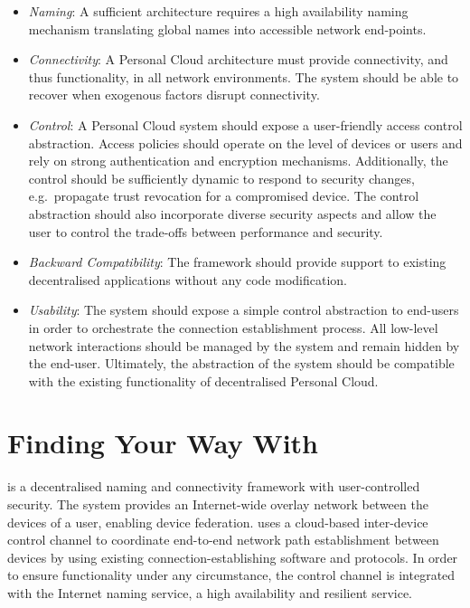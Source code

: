 \begin{itemize}
    \item {\it Naming}\/: A sufficient architecture requires a high
    availability naming mechanism translating global names into accessible
    network end-points.

  \item {\it Connectivity}\/: A Personal Cloud architecture must provide
    connectivity, and thus functionality, in all network environments.  The
    system should be able to recover when exogenous factors disrupt
    connectivity.

  \item {\it Control}\/: A Personal Cloud system should expose a user-friendly
    access control abstraction.  Access policies should operate on the level
    of devices or users and rely on strong authentication and encryption
    mechanisms. Additionally, the control should be sufficiently dynamic to
    respond to security changes, e.g.~propagate trust revocation for a
    compromised device. The control abstraction should also
    incorporate diverse security aspects and allow the user to control the
    trade-offs between performance and security.

  \item {\it Backward Compatibility}\/: The framework should provide support to
    existing decentralised applications without any code modification.

  \item {\it Usability}\/: The system should expose a simple control abstraction
    to end-users in order to orchestrate the connection establishment
    process. All low-level network interactions should be managed by the
    system and remain hidden by the end-user. Ultimately, the
    abstraction of the system should be compatible with the existing
    functionality of decentralised Personal Cloud. 

 \end{itemize}


\section{Finding Your Way With \signpost}\label{sec:sp-signpost}

\signpost is a decentralised naming and connectivity framework with
user-controlled security.  The system provides an Internet-wide overlay network
between the devices of a user, enabling device federation.
\signpost uses a cloud-based inter-device control channel to
coordinate end-to-end network path establishment between devices by using existing
connection-establishing software and protocols.  In order to ensure functionality
under any circumstance, the \signpost control channel is integrated with the
Internet naming service, a high availability and resilient service. 

